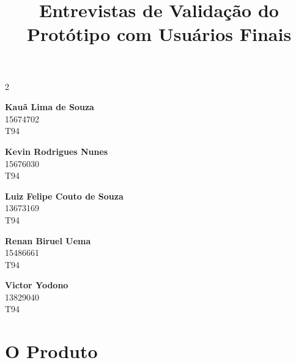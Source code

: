 \documentclass[a4paper]{article}
\title{
    \textbf{Entrevistas de Validação do Protótipo com Usuários Finais}
}
\date{}
\begin{document}
\maketitle
\vspace{-1.5cm}
\thispagestyle{firstpage}


\begin{multicols}{2}
    \centering

    \textbf{Kauã Lima de Souza}\\
    15674702\\
    T94

    \vspace{0.5cm}

    \textbf{Kevin Rodrigues Nunes}\\
    15676030\\
    T94

    \vspace{0.5cm}

    \textbf{Luiz Felipe Couto de Souza}\\
    13673169\\
    T94

    \vspace{0.5cm}

    \textbf{Renan Biruel Uema}\\
    15486661\\
    T94

\end{multicols}

\vspace{-0.2cm} %

\begin{center}
    \textbf{Victor Yodono}\\
    13829040\\
    T94
\end{center}

\vspace{0.5cm}


\singlespacing
\setlength{\parskip}{6pt}
\setlength{\parindent}{0.5cm}

\section{O Produto}
\end{document}
